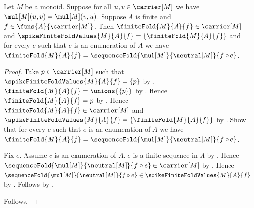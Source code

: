 \begin{theorem}\label{spike_finite_fold_canonical}
    Let $M$ be a monoid.
    Suppose for all $u,v\in\carrier[M]$ we have
        $\mul[M](u,v)=\mul[M](v,u)$.
    Suppose $A$ is finite and $f\in\funs{A}{\carrier[M]}$.
    Then
        $\finiteFold{M}{A}{f}\in\carrier[M]$ and
        $\spikeFiniteFoldValues{M}{A}{f}
            =\{\finiteFold{M}{A}{f}\}$ and
        for every $e$ such that $e$ is an enumeration of $A$ we have
            $\finiteFold{M}{A}{f}
                =\sequenceFold{\mul[M]}{\neutral[M]}{f\circ e}$.
\end{theorem}
\begin{proof}
    Take $p\in\carrier[M]$ such that
        $\spikeFiniteFoldValues{M}{A}{f}=\{p\}$ by
        .
    $\finiteFold{M}{A}{f}=\unions{\{p\}}$ by
        .
    Hence $\finiteFold{M}{A}{f}=p$ by
        .
    Hence $\finiteFold{M}{A}{f}\in\carrier[M]$ and
        $\spikeFiniteFoldValues{M}{A}{f}
            =\{\finiteFold{M}{A}{f}\}$ by \auto.
    Show that for every $e$ such that $e$ is an enumeration of $A$
        we have
            $\finiteFold{M}{A}{f}
                =\sequenceFold{\mul[M]}{\neutral[M]}{f\circ e}$.
    \begin{subproof}
        Fix $e$.
        Assume $e$ is an enumeration of $A$.
        $e$ is a finite sequence in $A$ by
            .
        Hence
            $\sequenceFold{\mul[M]}{\neutral[M]}{f\circ e}
                \in\carrier[M]$ by .
        Hence
            $\sequenceFold{\mul[M]}{\neutral[M]}{f\circ e}
                \in\spikeFiniteFoldValues{M}{A}{f}$ by
            .
        Follows by .
    \end{subproof}
    Follows.
\end{proof}
